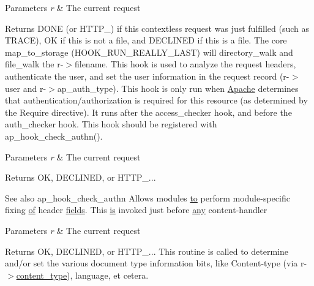 \begin{DoxyParams}{Parameters}
{\em r} & The current request \\
\hline
\end{DoxyParams}
\begin{DoxyReturn}{Returns}
D\+O\+NE (or H\+T\+T\+P\+\_\+) if this contextless request was just fulfilled (such as T\+R\+A\+CE), OK if this is not a file, and D\+E\+C\+L\+I\+N\+ED if this is a file. The core map\+\_\+to\+\_\+storage (H\+O\+O\+K\+\_\+\+R\+U\+N\+\_\+\+R\+E\+A\+L\+L\+Y\+\_\+\+L\+A\+ST) will directory\+\_\+walk and file\+\_\+walk the r-\/$>$filename. This hook is used to analyze the request headers, authenticate the user, and set the user information in the request record (r-\/$>$user and r-\/$>$ap\+\_\+auth\+\_\+type). This hook is only run when \hyperlink{namespaceApache}{Apache} determines that authentication/authorization is required for this resource (as determined by the \textquotesingle{}Require\textquotesingle{} directive). It runs after the access\+\_\+checker hook, and before the auth\+\_\+checker hook. This hook should be registered with ap\+\_\+hook\+\_\+check\+\_\+authn().
\end{DoxyReturn}

\begin{DoxyParams}{Parameters}
{\em r} & The current request \\
\hline
\end{DoxyParams}
\begin{DoxyReturn}{Returns}
OK, D\+E\+C\+L\+I\+N\+ED, or H\+T\+T\+P\+\_\+...
\end{DoxyReturn}
\begin{DoxySeeAlso}{See also}
ap\+\_\+hook\+\_\+check\+\_\+authn Allows modules \hyperlink{pcretest_8txt_aa22c98f630e4b3fe86ee17ce5150c62f}{to} perform module-\/specific fixing \hyperlink{pcre_8txt_a9d5b55a535a7d176d14b62d664b47b4d}{of} header \hyperlink{pcre_8txt_a17e2a619a5772fa0fccf743c125ea249}{fields}. This \hyperlink{NON-AUTOTOOLS-BUILD_8txt_a2569119f3fd3f0d7d7ecea3c96acb0bf}{is} invoked just before \hyperlink{README_8txt_a117db88886e3b44e72c9457ba51928bc}{any} content-\/handler 
\end{DoxySeeAlso}

\begin{DoxyParams}{Parameters}
{\em r} & The current request \\
\hline
\end{DoxyParams}
\begin{DoxyReturn}{Returns}
OK, D\+E\+C\+L\+I\+N\+ED, or H\+T\+T\+P\+\_\+... This routine is called to determine and/or set the various document type information bits, like Content-\/type (via r-\/$>$\hyperlink{structcontent__type}{content\+\_\+type}), language, et cetera. 
\end{DoxyReturn}

